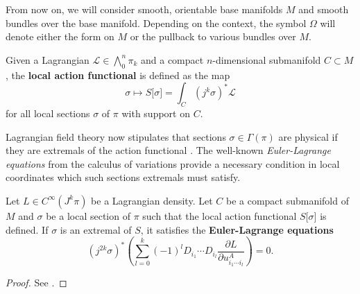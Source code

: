 From now on, we will consider smooth, orientable base manifolds $M$ and smooth bundles over the base manifold. Depending on the context, the symbol $\Omega$ will denote either the form on $M$ or the pullback to various bundles over $M$.

\begin{definition}
  Given a Lagrangian $\mathscr L \in \bigwedge^n_0\pi_k$ and a compact $n$-dimensional submanifold $C \subset M$, the \textbf{local action functional} is defined as the map
  \begin{equation}
    \sigma \mapsto S\lbrack\sigma\rbrack = \int_C (j^k\sigma)^\ast\mathscr L
  \end{equation}
for all local sections $\sigma$ of $\pi$ with support on $C$.
\end{definition}

Lagrangian field theory now stipulates that sections $\sigma\in\Gamma(\pi)$ are physical if they are extremals of the action functional \cite{Saunders_1989}. The well-known \emph{Euler-Lagrange equations} from the calculus of variations provide a necessary condition in local coordinates which such sections extremals must satisfy.
\begin{proposition}
  Let $L\in C^\infty(J^k\pi)$ be a Lagrangian density. Let $C$ be a compact submanifold of $M$ and $\sigma$ be a local section of $\pi$ such that the local action functional $S\lbrack\sigma\rbrack$ is defined. If $\sigma$ is an extremal of $S$, it satisfies the \textbf{Euler-Lagrange equations}
  \begin{equation}\label{euler_lagrange_local}
    (j^{2k}\sigma)^\ast\left( \sum_{l=0}^{k} (-1)^l D_{i_1} \cdots D_{i_l} \frac{\partial L}{\partial u^A_{i_1\cdots i_l}}\right) = 0.
  \end{equation}
\end{proposition}
\begin{proof}
  See \cite{Saunders_1989}.
\end{proof}

